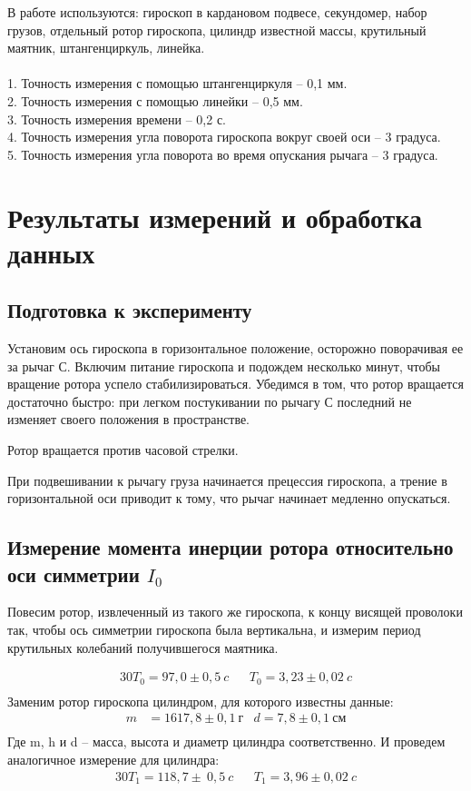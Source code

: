\documentclass[a4paper,12pt]{article} %
\begin{document}
В работе используются: гироскоп в кардановом подвесе, секундомер, набор грузов, отдельный ротор гироскопа, цилиндр известной массы, крутильный маятник, штангенциркуль, линейка.\\
\\
1. Точность измерения с помощью штангенциркуля -- 0,1 мм. \\
2. Точность измерения с помощью линейки -- 0,5 мм. \\
3. Точность измерения времени -- 0,2 с. \\
4. Точность измерения угла поворота гироскопа вокруг своей оси -- 3 градуса. \\
5. Точность измерения угла поворота во время опускания рычага -- 3 градуса. \\
\section{Результаты измерений и обработка данных}
\subsection{Подготовка к эксперименту}
Установим ось гироскопа в горизонтальное положение, осторожно поворачивая ее за рычаг С.
Включим питание гироскопа и подождем несколько минут, чтобы вращение ротора успело стабилизироваться.
Убедимся в том, что ротор вращается достаточно быстро: при легком постукивании по рычагу С последний не изменяет своего положения в пространстве.

Ротор вращается против часовой стрелки. 

При подвешивании к рычагу груза начинается прецессия гироскопа, а трение в горизонтальной оси приводит к тому, что рычаг начинает медленно опускаться.

\subsection{Измерение момента инерции ротора относительно оси симметрии $I_0$}
Повесим ротор, извлеченный из такого же гироскопа, к концу висящей проволоки так, чтобы ось симметрии гироскопа была вертикальна, и измерим период крутильных колебаний получившегося маятника.

\begin{align*}
  30T_0 =  97,0 \pm 0,5 \ c && T_0 = 3,23 \pm 0,02 \ c\\
\end{align*}
Заменим ротор гироскопа цилиндром, для которого известны данные:
\begin{align*}
  m &= 1617,8 \pm 0,1 \ г & d = 7,8 \pm 0,1 \ см\\
\end{align*}
Где m, h и d -- масса, высота и диаметр цилиндра соответственно.
И проведем аналогичное измерение для цилиндра:
\begin{align*}
  30T_1 =  118,7 \pm \ 0,5 \ c && T_1 = 3,96 \pm 0,02 \ c\\
\end{align*}
\end{document}
